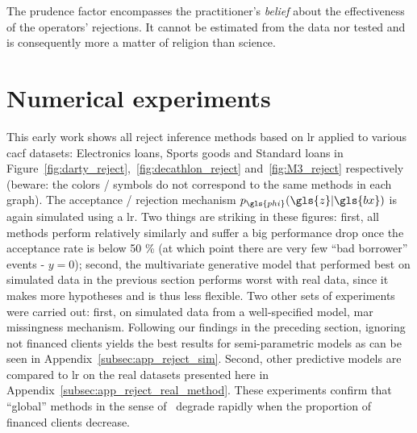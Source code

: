 The prudence factor encompasses the practitioner's \textit{belief} about the effectiveness of the operators' rejections. It cannot be estimated from the data nor tested and is consequently more a matter of religion than science.

%

\section{Numerical experiments} \label{sec:num_exp_reject}

This early work shows all reject inference methods based on \gls{lr} applied to various \gls{cacf} datasets: Electronics loans, Sports goods and Standard loans in Figure~\ref{fig:darty_reject},~\ref{fig:decathlon_reject} and~\ref{fig:M3_reject} respectively (beware: the colors / symbols do not correspond to the same methods in each graph). The acceptance / rejection mechanism $p_{\gls{phi}}(\gls{z} | \gls{bx})$ is again simulated using a \gls{lr}. Two things are striking in these figures: first, all methods perform relatively similarly and suffer a big performance drop once the acceptance rate is below 50 \% (at which point there are very few ``bad borrower'' events - $y = 0$); second, the multivariate generative model that performed best on simulated data in the previous section performs worst with real data, since it makes more hypotheses and is thus less flexible. Two other sets of experiments were carried out: first, on simulated data from a well-specified model, \gls{mar} missingness mechanism. Following our findings in the preceding section, ignoring not financed clients yields the best results for semi-parametric models as can be seen in Appendix~\ref{subsec:app_reject_sim}. Second, other predictive models are compared to \gls{lr} on the real datasets presented here in Appendix~\ref{subsec:app_reject_real_method}. These experiments confirm that ``global'' methods in the sense of~\cite{} degrade rapidly when the proportion of financed clients decrease.


